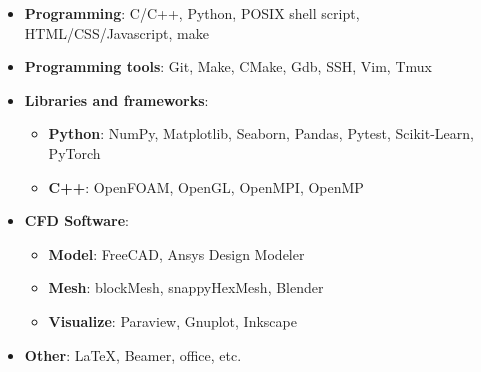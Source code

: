 \vspace{10pt}

{
  \vspace{1em}
  \begin{itemize}
    \shorthandoff{:}
    \item \textbf{Programming}: C/C++, Python, POSIX shell script, HTML/CSS/Javascript, make
    \item \textbf{Programming tools}: Git, Make, CMake, Gdb, SSH, Vim, Tmux
    \item \textbf{Libraries and frameworks}:
      \begin{itemize}
        \item \textbf{Python}: NumPy, Matplotlib, Seaborn, Pandas, Pytest, Scikit-Learn, PyTorch
        \item \textbf{C++}: OpenFOAM, OpenGL, OpenMPI, OpenMP
      \end{itemize}

    \item \textbf{CFD Software}:
      \begin{itemize}
        \item \textbf{Model}: FreeCAD, Ansys Design Modeler
        \item \textbf{Mesh}: blockMesh, snappyHexMesh, Blender
        \item \textbf{Visualize}: Paraview, Gnuplot, Inkscape
      \end{itemize}
    \item \textbf{Other}: \LaTeX, Beamer, office, etc.
    \shorthandon{:}
  \end{itemize}
}

